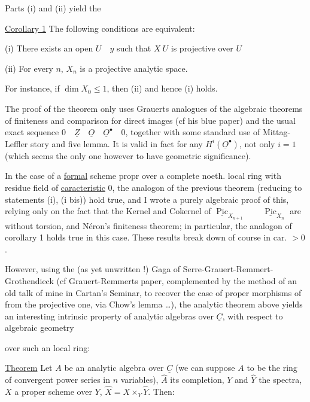 

Parts (i) and (ii) yield the

\uline{Corollary 1} The following conditions are equivalent:

(i) There exists an open $U\quad y$ such that $X\ U$ is projective over $U$

(ii) For every $n$, $X_n$ is a projective analytic space.

For instance, if $\dim X_0\leq 1$, then (ii) and hence (i) holds.

The proof of the theorem only uses Grauerts analogues of the algebraic theorems of finiteness and comparison for direct images (cf his blue paper) and the usual exact sequence $0\quad\underline{Z}\quad\underline{O}\quad\underline{O}^{\bullet}\quad0$, together with some standard use of Mittag-Leffler story and five lemma. It is valid in fact for any $H^i(\underline{O}^{\bullet})$, not only $i=1$ (which seems the only one however to have geometric significance).

In the case of a \uline{formal} scheme propr over a complete noeth. local ring with residue field of \uline{caracteristic} 0, the analogon of the previous theorem (reducing to statements (i), (i bis))  hold true, and I wrote a purely algebraic proof of this, relying only on the fact that the Kernel and Cokernel of $\underline{\operatorname{Pic}}_{X_{n+1}}\qquad\underline{\operatorname{Pic}}_{X_n}$ are without torsion, and Néron's finiteness theorem; in particular, the analogon of corollary 1 holds true in this case. These results break down of course in car. $>0$.

However, using the (as yet unwritten !) Gaga of Serre-Grauert-Remmert-Grothendieck (cf Grauert-Remmerts paper, complemented by the method of an old talk of mine in Cartan's Seminar, to recover the case of proper morphisms of  from the projective one, via Chow's lemma \ldots), the analytic theorem above yields an interesting intrinsic property of analytic algebras over $\underline{C}$, with respect to algebraic geometry



over such an local ring:

\uline{Theorem} Let $A$ be an analytic algebra over $\underline{C}$ (we can suppose $A$ to be the ring of convergent power series\deleted{\unsure{)}} in $n$ variables), $\widehat{A}$ its completion, $Y$ and $\widehat{Y}$ the spectra, $X$ a proper scheme over $Y$, $\widehat{X}=X\times_Y\widehat{Y}$. Then:

